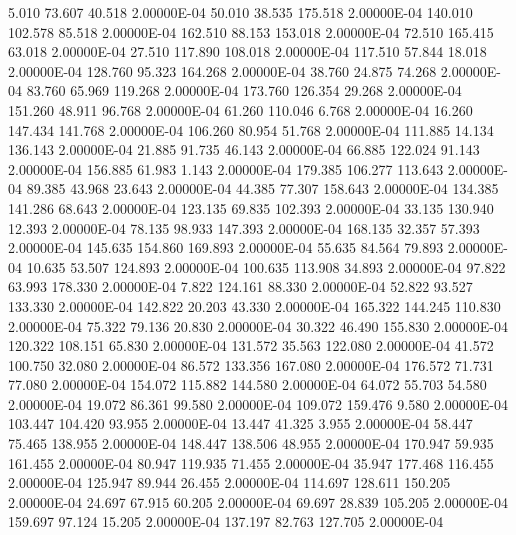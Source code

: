      5.010    73.607    40.518  2.00000E-04
    50.010    38.535   175.518  2.00000E-04
   140.010   102.578    85.518  2.00000E-04
   162.510    88.153   153.018  2.00000E-04
    72.510   165.415    63.018  2.00000E-04
    27.510   117.890   108.018  2.00000E-04
   117.510    57.844    18.018  2.00000E-04
   128.760    95.323   164.268  2.00000E-04
    38.760    24.875    74.268  2.00000E-04
    83.760    65.969   119.268  2.00000E-04
   173.760   126.354    29.268  2.00000E-04
   151.260    48.911    96.768  2.00000E-04
    61.260   110.046     6.768  2.00000E-04
    16.260   147.434   141.768  2.00000E-04
   106.260    80.954    51.768  2.00000E-04
   111.885    14.134   136.143  2.00000E-04
    21.885    91.735    46.143  2.00000E-04
    66.885   122.024    91.143  2.00000E-04
   156.885    61.983     1.143  2.00000E-04
   179.385   106.277   113.643  2.00000E-04
    89.385    43.968    23.643  2.00000E-04
    44.385    77.307   158.643  2.00000E-04
   134.385   141.286    68.643  2.00000E-04
   123.135    69.835   102.393  2.00000E-04
    33.135   130.940    12.393  2.00000E-04
    78.135    98.933   147.393  2.00000E-04
   168.135    32.357    57.393  2.00000E-04
   145.635   154.860   169.893  2.00000E-04
    55.635    84.564    79.893  2.00000E-04
    10.635    53.507   124.893  2.00000E-04
   100.635   113.908    34.893  2.00000E-04
    97.822    63.993   178.330  2.00000E-04
     7.822   124.161    88.330  2.00000E-04
    52.822    93.527   133.330  2.00000E-04
   142.822    20.203    43.330  2.00000E-04
   165.322   144.245   110.830  2.00000E-04
    75.322    79.136    20.830  2.00000E-04
    30.322    46.490   155.830  2.00000E-04
   120.322   108.151    65.830  2.00000E-04
   131.572    35.563   122.080  2.00000E-04
    41.572   100.750    32.080  2.00000E-04
    86.572   133.356   167.080  2.00000E-04
   176.572    71.731    77.080  2.00000E-04
   154.072   115.882   144.580  2.00000E-04
    64.072    55.703    54.580  2.00000E-04
    19.072    86.361    99.580  2.00000E-04
   109.072   159.476     9.580  2.00000E-04
   103.447   104.420    93.955  2.00000E-04
    13.447    41.325     3.955  2.00000E-04
    58.447    75.465   138.955  2.00000E-04
   148.447   138.506    48.955  2.00000E-04
   170.947    59.935   161.455  2.00000E-04
    80.947   119.935    71.455  2.00000E-04
    35.947   177.468   116.455  2.00000E-04
   125.947    89.944    26.455  2.00000E-04
   114.697   128.611   150.205  2.00000E-04
    24.697    67.915    60.205  2.00000E-04
    69.697    28.839   105.205  2.00000E-04
   159.697    97.124    15.205  2.00000E-04
   137.197    82.763   127.705  2.00000E-04
